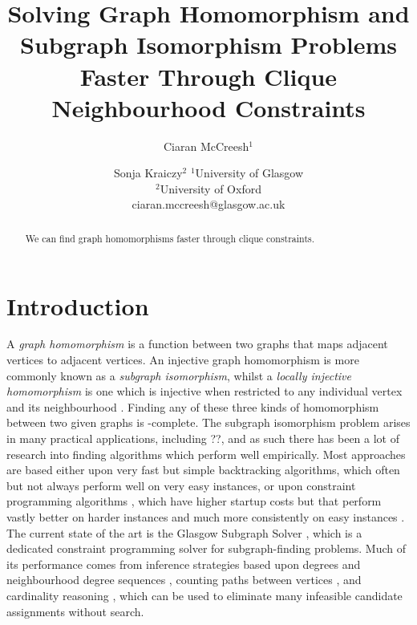 \documentclass{article}
\title{Solving Graph Homomorphism and Subgraph Isomorphism Problems Faster Through Clique Neighbourhood
Constraints}
\author{
Ciaran McCreesh$^1$
\and
Sonja Kraiczy$^2$
\affiliations
$^1$University of Glasgow\\
$^2$University of Oxford\\
\emails
ciaran.mccreesh@glasgow.ac.uk
}
\begin{document}
\maketitle

\begin{abstract}
    We can find graph homomorphisms faster through clique constraints.
\end{abstract}

\section{Introduction}

A \emph{graph homomorphism} is a function between two graphs that maps adjacent vertices to adjacent
vertices. An injective graph homomorphism is more commonly known as a \emph{subgraph isomorphism},
whilst a \emph{locally injective homomorphism} is one which is injective when restricted to any
individual vertex and its neighbourhood \cite{DBLP:journals/csr/FialaK08}. Finding any of these three kinds of homomorphism between
two given graphs is \NP-complete.  The subgraph isomorphism problem arises in many practical
applications, including ??, and as such there has been a lot of research into finding algorithms
which perform well empirically. Most approaches are based either upon very fast but simple
backtracking algorithms,
\cite{DBLP:journals/pami/CordellaFSV04,DBLP:journals/bmcbi/BonniciGPSF13,DBLP:conf/gbrpr/CarlettiFSV17}
which often but not always perform well on very easy instances, or upon constraint programming
algorithms
\cite{DBLP:journals/constraints/ZampelliDS10,DBLP:journals/ai/Solnon10,DBLP:conf/cp/AudemardLMGP14,DBLP:conf/cp/McCreeshP15,DBLP:conf/cpaior/ArchibaldDHMP019},
which have higher startup costs but that perform vastly better on harder instances and much more
consistently on easy instances \cite{DBLP:journals/jair/McCreeshPST18,DBLP:conf/gbrpr/Solnon19}. The
current state of the art is the Glasgow Subgraph Solver \cite{DBLP:conf/gg/McCreeshP020}, which is a
dedicated constraint programming solver for subgraph-finding problems. Much of its performance comes
from inference strategies based upon degrees and neighbourhood degree sequences
\cite{DBLP:journals/constraints/ZampelliDS10}, counting paths between vertices
\cite{DBLP:conf/cp/AudemardLMGP14,DBLP:conf/cp/McCreeshP15}, and cardinality reasoning
\cite{DBLP:journals/ai/Solnon10}, which can be used to eliminate many infeasible candidate
assignments without search.
\end{document}
